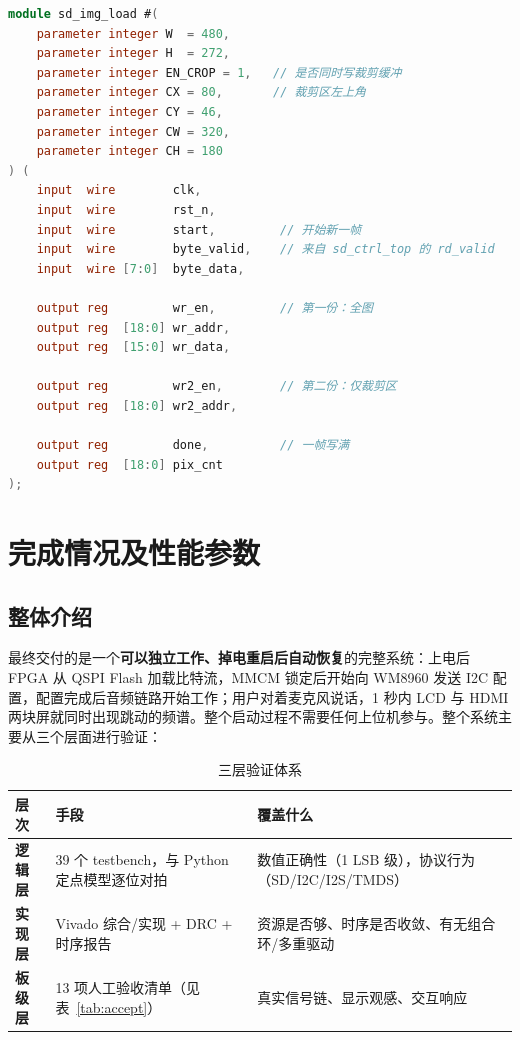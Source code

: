 \documentclass[withoutpreface,bwprint]{cumcmthesis}
\begin{document}
\begin{lstlisting}[language=Verilog, basicstyle=\ttfamily\zihao{6},
                   frame=single, rulecolor=\color{boxFrame}]
module sd_img_load #(
    parameter integer W  = 480,
    parameter integer H  = 272,
    parameter integer EN_CROP = 1,   // 是否同时写裁剪缓冲
    parameter integer CX = 80,       // 裁剪区左上角
    parameter integer CY = 46,
    parameter integer CW = 320,
    parameter integer CH = 180
) (
    input  wire        clk,
    input  wire        rst_n,
    input  wire        start,         // 开始新一帧
    input  wire        byte_valid,    // 来自 sd_ctrl_top 的 rd_valid
    input  wire [7:0]  byte_data,

    output reg         wr_en,         // 第一份：全图
    output reg  [18:0] wr_addr,
    output reg  [15:0] wr_data,

    output reg         wr2_en,        // 第二份：仅裁剪区
    output reg  [18:0] wr2_addr,

    output reg         done,          // 一帧写满
    output reg  [18:0] pix_cnt
);
\end{lstlisting}

\newpage
\section{完成情况及性能参数}

\subsection{整体介绍}

最终交付的是一个\textbf{可以独立工作、掉电重启后自动恢复}的完整系统：上电后 FPGA 从 QSPI Flash 加载比特流，MMCM 锁定后开始向 WM8960 发送 I2C 配置，配置完成后音频链路开始工作；用户对着麦克风说话，1 秒内 LCD 与 HDMI 两块屏就同时出现跳动的频谱。整个启动过程不需要任何上位机参与。整个系统主要从三个层面进行验证：

\begin{table}[H]
\centering
\caption{三层验证体系}
\label{tab:verify}
\begin{tabular}{p{1.5cm}p{4.0cm}p{4.8cm}}
\toprule[1.5pt]
\rowcolor{gray!25} 层次 & 手段 & 覆盖什么 \\
\midrule[1pt]
\textbf{逻辑层} & 39 个 testbench，与 Python 定点模型逐位对拍 & 数值正确性（1 LSB 级），协议行为（SD/I2C/I2S/TMDS） \\
\textbf{实现层} & Vivado 综合/实现 + DRC + 时序报告 & 资源是否够、时序是否收敛、有无组合环/多重驱动 \\
\textbf{板级层} & 13 项人工验收清单（见表~\ref{tab:accept}） & 真实信号链、显示观感、交互响应 \\
\bottomrule[1.5pt]
\end{tabular}
\end{table}
\end{document}
